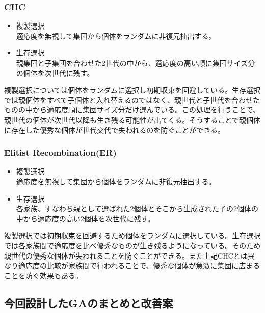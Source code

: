 \subsubsection{CHC}
\begin{itemize}
\item{複製選択}\\
適応度を無視して集団から個体をランダムに非復元抽出する。
\item{生存選択}\\
親集団と子集団を合わせた2世代の中から、適応度の高い順に集団サイズ分の個体を次世代に残す。
\end{itemize}
複製選択については個体をランダムに選択し初期収束を回避している。生存選択では親個体をすべて子個体と入れ替えるのではなく、親世代と子世代を合わせたものの中から適応度順に集団サイズ分だけ選んでいる。この処理を行うことで、親世代の個体が次世代以降も生き残る可能性が出てくる。そうすることで親個体に存在した優秀な個体が世代交代で失われるのを防ぐことができる。

\subsubsection{Elitist Recombination(ER)}
\begin{itemize}
\item{複製選択}\\
適応度を無視して集団から個体をランダムに非復元抽出する。
\item{生存選択}\\
各家族、すなわち親として選ばれた2個体とそこから生成された子の2個体の中から適応度の高い2個体を次世代に残す。
\end{itemize}
複製選択では初期収束を回避するため個体をランダムに選択している。生存選択では各家族間で適応度を比べ優秀なものが生き残るようになっている。そのため親世代の優秀な個体が失われることを防ぐことができる。また上記CHCとは異なり適応度の比較が家族間で行われることで、優秀な個体が急激に集団に広まることを防ぐ効果もある。

\subsection{今回設計したGAのまとめと改善案}
